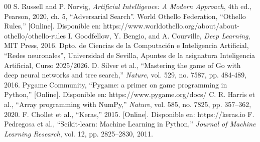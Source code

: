 \documentclass[conference]{IEEEtran}
\begin{document}
\begin{thebibliography}{00}
     S. Russell and P. Norvig, \textit{Artificial Intelligence: A Modern Approach}, 4th ed., Pearson, 2020, ch. 5, ``Adversarial Search''.
     World Othello Federation, ``Othello Rules,'' [Online]. Disponible en: https://www.worldothello.org/about/about-othello/othello-rules
     I. Goodfellow, Y. Bengio, and A. Courville, \textit{Deep Learning}, MIT Press, 2016.    
     Dpto. de Ciencias de la Computación e Inteligencia Artificial, ``Redes neuronales'', Universidad de Sevilla, Apuntes de la asignatura Inteligencia Artificial, Curso 2025/2026.
     D. Silver et al., ``Mastering the game of Go with deep neural networks and tree search,'' \textit{Nature}, vol. 529, no. 7587, pp. 484-489, 2016.
     Pygame Community, ``Pygame: a primer on game programming in Python,'' [Online]. Disponible en: https://www.pygame.org/docs/
     C. R. Harris et al., ``Array programming with NumPy,'' \textit{Nature}, vol. 585, no. 7825, pp. 357--362, 2020.
     F. Chollet et al., ``Keras,'' 2015. [Online]. Disponible en: https://keras.io
     F. Pedregosa et al., ``Scikit-learn: Machine Learning in Python,'' \textit{Journal of Machine Learning Research}, vol. 12, pp. 2825--2830, 2011.
\end{thebibliography}    
\end{document}
